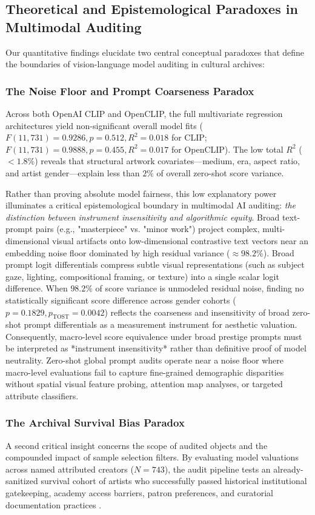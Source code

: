 \documentclass[pdflatex,sn-mathphys-num]{sn-jnl}%
\theoremstyle{thmstyleone}%
\theoremstyle{thmstyletwo}%
\theoremstyle{thmstylethree}%
\begin{document}
\subsection{Theoretical and Epistemological Paradoxes in Multimodal Auditing}
Our quantitative findings elucidate two central conceptual paradoxes that define the boundaries of vision-language model auditing in cultural archives:

\subsubsection{The Noise Floor and Prompt Coarseness Paradox}
Across both OpenAI CLIP and OpenCLIP, the full multivariate regression architectures yield non-significant overall model fits ($F(11, 731) = 0.9286, p = 0.512, R^2 = 0.018$ for CLIP; $F(11, 731) = 0.9888, p = 0.455, R^2 = 0.017$ for OpenCLIP). The low total $R^2$ ($<1.8\%$) reveals that structural artwork covariates—medium, era, aspect ratio, and artist gender—explain less than $2\%$ of overall zero-shot score variance. 

Rather than proving absolute model fairness, this low explanatory power illuminates a critical epistemological boundary in multimodal AI auditing: \textit{the distinction between instrument insensitivity and algorithmic equity}. Broad text-prompt pairs (e.g., "masterpiece" vs. "minor work") project complex, multi-dimensional visual artifacts onto low-dimensional contrastive text vectors near an embedding noise floor dominated by high residual variance ($\approx 98.2\%$). Broad prompt logit differentials compress subtle visual representations (such as subject gaze, lighting, compositional framing, or texture) into a single scalar logit difference. When $98.2\%$ of score variance is unmodeled residual noise, finding no statistically significant score difference across gender cohorts ($p = 0.1829, p_{\text{TOST}} = 0.0042$) reflects the coarseness and insensitivity of broad zero-shot prompt differentials as a measurement instrument for aesthetic valuation. Consequently, macro-level score equivalence under broad prestige prompts must be interpreted as *instrument insensitivity* rather than definitive proof of model neutrality. Zero-shot global prompt audits operate near a noise floor where macro-level evaluations fail to capture fine-grained demographic disparities without spatial visual feature probing, attention map analyses, or targeted attribute classifiers.

\subsubsection{The Archival Survival Bias Paradox}
A second critical insight concerns the scope of audited objects and the compounded impact of sample selection filters. By evaluating model valuations across named attributed creators ($N=743$), the audit pipeline tests an already-sanitized survival cohort of artists who successfully passed historical institutional gatekeeping, academy access barriers, patron preferences, and curatorial documentation practices \cite{carlson2022museum, topaz2019diversity}.
\end{document}
